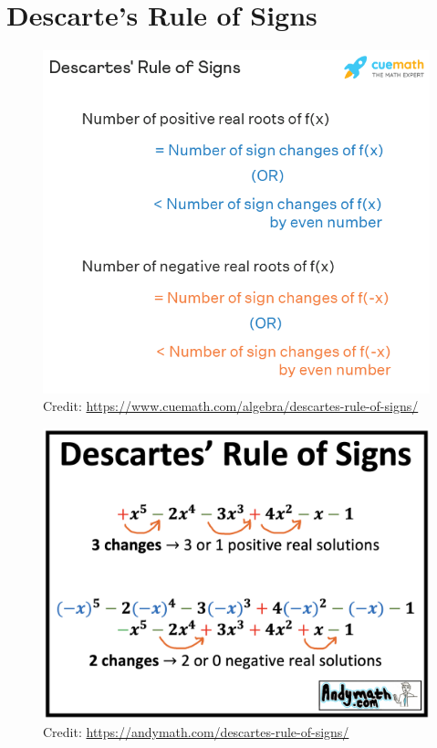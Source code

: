 \documentclass[12pt]{article}
\begin{document}
\section{Descarte's Rule of Signs}

\begin{figure}[H]
	\centering
	\includegraphics[scale=0.6]{drs.png}
	\caption{Credit: \url{https://www.cuemath.com/algebra/descartes-rule-of-signs/}}
\end{figure}

\begin{figure}[H]
	\centering
	\includegraphics[scale=0.3]{drs2.png}
	\caption{Credit: \url{https://andymath.com/descartes-rule-of-signs/}}
\end{figure}
\end{document}
